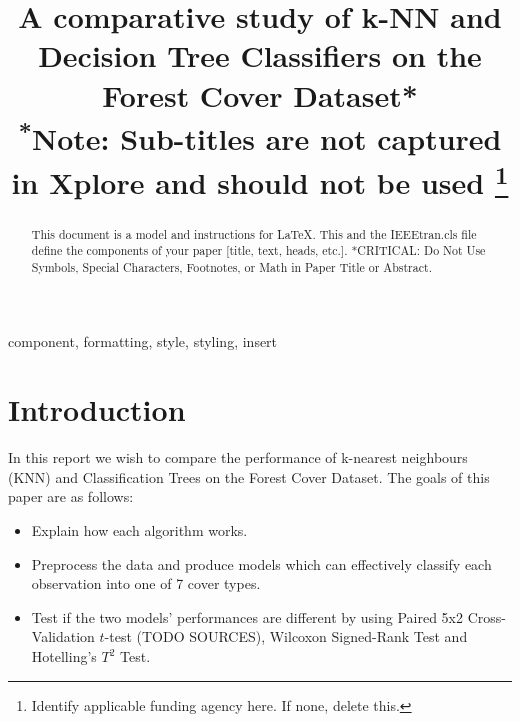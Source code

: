 \documentclass[conference]{IEEEtran}
\begin{document}
\title{A comparative study of k-NN and Decision Tree Classifiers on the Forest Cover Dataset*\\
{\footnotesize \textsuperscript{*}Note: Sub-titles are not captured in Xplore and
should not be used}
\thanks{Identify applicable funding agency here. If none, delete this.}
}

\author{
}


\maketitle

\begin{abstract}
This document is a model and instructions for \LaTeX.
This and the IEEEtran.cls file define the components of your paper [title, text, heads, etc.]. *CRITICAL: Do Not Use Symbols, Special Characters, Footnotes, 
or Math in Paper Title or Abstract.
\end{abstract}

\begin{IEEEkeywords}
component, formatting, style, styling, insert
\end{IEEEkeywords}

\section{Introduction}


In this report we wish to compare the performance of k-nearest neighbours (KNN) and Classification Trees on the Forest Cover Dataset. The goals of this paper are as follows:
\begin{itemize}
	\item Explain how each algorithm works.
	\item Preprocess the data and produce models which can effectively classify each observation into one of 7 cover types.
	\item Test if the two models' performances are different by using Paired 5x2 Cross-Validation $t$-test (TODO SOURCES), Wilcoxon Signed-Rank Test and Hotelling's $T^2$ Test.
\end{itemize}
\end{document}
